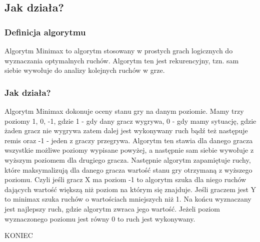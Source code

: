 \documentclass{beamer}
\begin{document}
\subsection{Jak działa?}
\begin{frame}
\frametitle{Definicja algorytmu}
Algorytm Minimax to algorytm stosowany w prostych grach logicznych do wyznaczania optymalnych ruchów. Algorytm ten jest rekurencyjny, tzn. sam siebie wywołuje do analizy kolejnych ruchów w grze. 

\end{frame}
\begin{frame}
\frametitle{Jak działa?}
Algorytm Minimax dokonuje oceny stanu gry na danym poziomie. Mamy trzy poziomy 1, 0, -1, gdzie 1 - gdy dany gracz wygrywa, 0 - gdy mamy sytuację, gdzie żaden gracz nie wygrywa zatem dalej jest wykonywany ruch bądź też następuje remis oraz -1 - jeden z graczy przegrywa. Algorytm ten stawia dla danego gracza wszystkie możliwe poziomy wypisane powyżej, a następnie sam siebie wywołuje z wyższym poziomem dla drugiego gracza. Następnie algorytm zapamiętuje ruchy, które maksymalizują dla danego gracza wartość stanu gry otrzymaną z wyższego poziomu. Czyli jeśli gracz X ma poziom -1 to algorytm szuka dla niego ruchów dających wartość większą niż poziom na którym się znajduje. Jeśli graczem jest Y to minimax szuka ruchów o wartościach mniejszych niż 1. Na końcu wyznaczany jest najlepszy ruch, gdzie algorytm zwraca jego wartość. Jeżeli poziom wyznaczonego poziomu jest równy 0 to ruch jest wykonywany.

\end{frame}
\begin{frame}
\Huge{\centerline{KONIEC}}
\end{frame}

\end{document}
